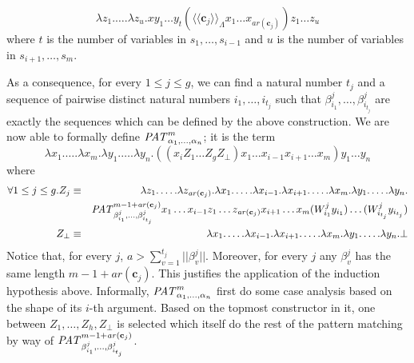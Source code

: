 \documentclass{LMCS}
\newcommand{\conone}{\mathbf{c}}
\newcommand{\patone}{s}
\newcommand{\seqpone}{\alpha}
\newcommand{\seqptwo}{\beta}
\newcommand{\varone}{x}
\newcommand{\vartwo}{y}
\newcommand{\varthree}{z}
\newcommand{\valuetwo}{W}
\newcommand{\valuethree}{Z}
\newcommand{\TRSonetolambdaI}[1]{\langle\!\langle #1\rangle\!\rangle_{\Lambdaterms}}
\newcommand{\errorterm}{\bot}
\newcommand{\arity}[1]{\mathit{ar}(#1)}
\newcommand{\dsize}[1]{||#1||}
\newcommand{\Lambdaterms}{\Lambda}
\newenvironment{varitemize}
{
\begin{list}{\labelitemi}
{\setlength{\itemsep}{0.0mm}
 \setlength{\topsep}{0.0mm}
 \setlength{\parindent}{0.0mm}
 \setlength{\parskip}{0.0mm}
 \setlength{\parsep}{0.0mm}
 \setlength{\partopsep}{0.0mm}
 \setlength{\leftmargin}{15pt}
 \setlength{\labelsep}{5pt}
 \setlength{\labelwidth}{10pt}}}
{
 \end{list} 
}
\newenvironment{varitemizeii}
{
\begin{list}{\labelitemiv}
{\setlength{\itemsep}{0.0mm}
 \setlength{\topsep}{0.0mm}
 \setlength{\parindent}{0.0mm}
 \setlength{\parskip}{0.0mm}
 \setlength{\parsep}{0.0mm}
 \setlength{\partopsep}{0.0mm}
 \setlength{\leftmargin}{15pt}
 \setlength{\labelsep}{5pt}
 \setlength{\labelwidth}{10pt}}}
{
 \end{list} 
}
\newcounter{number}
\begin{document}
\begin{varitemize}
\begin{varitemizeii}
$$    \lambda\varthree_1.\ldots.\lambda\varthree_u.\varone\vartwo_1\ldots\vartwo_t
    (\TRSonetolambdaI{\conone_j}\varone_1\ldots\varone_{\arity{\conone_j}})\varthree_1\ldots\varthree_u
    $$
    where $t$ is the number of variables in $\patone_1,\ldots,\patone_{i-1}$ and $u$ is the
    number of variables in $\patone_{i+1},\ldots,\patone_{m}$.
  \end{varitemizeii}
  As a consequence, for every $1\leq j\leq g$, we can find a natural number $t_j$ and 
  a sequence of pairwise distinct natural numbers $i_1,\ldots,i_{t_j}$ such that 
  $\seqptwo^j_{i_1},\ldots,\seqptwo^j_{i_{t_j}}$ are exactly the sequences which can
  be defined by the above construction. We are now able to formally define
  $\patlambda_{\seqpone_1,\ldots,\seqpone_n}^m$; it is the term
  $$
  \lambda\varone_1.\ldots.\lambda\varone_m.\lambda\vartwo_1.\ldots.\lambda\vartwo_n.
  ((\varone_i\valuethree_1\ldots\valuethree_g\valuethree_\bot)\varone_1\ldots\varone_{i-1}\varone_{i+1}\ldots\varone_m)
  \vartwo_1\ldots\vartwo_n
  $$
  where
  \begin{eqnarray*}
    \forall 1\leq j\leq g.\valuethree_j&\equiv&\lambda\varthree_1.\ldots.\lambda\varthree_{\arity{\conone_j}}.
    \lambda\varone_1.\ldots.\lambda\varone_{i-1}.\lambda\varone_{i+1}.\ldots.\lambda\varone_m.
    \lambda\vartwo_1.\ldots.\lambda\vartwo_n.\\
    & &\patlambda_{\seqptwo^j_{i_1},\ldots,\seqptwo^j_{i_{t_j}}}^{m-1+\arity{\conone_j}}\varone_1\ldots\varone_{i-1}\varthree_1\ldots\varthree_{\arity{\conone_j}}
      \varone_{i+1}\ldots\varone_m(\valuetwo^j_{i_1}\vartwo_{i_1})\ldots(\valuetwo^j_{i_{t_j}}\vartwo_{i_{t_j}})\\
    \valuethree_\bot&\equiv&\lambda\varone_1.\ldots.\lambda\varone_{i-1}.\lambda\varone_{i+1}.\ldots.\lambda\varone_m.
    \lambda\vartwo_1.\ldots.\lambda\vartwo_n.\errorterm
  \end{eqnarray*}
  Notice that, for every $j$,
  $a>\sum_{v=1}^{t_j}\dsize{\seqptwo^j_v}$. Moreover, for every $j$ any
  $\seqptwo^j_v$ has the same length $m-1+\arity{\conone_j}$.
  This justifies the application of the
  induction hypothesis above. Informally, $\patlambda_{\seqpone_1,\ldots,\seqpone_n}^m$ first do some case
  analysis based on the shape of its $i$-th argument. Based on the topmost constructor in it,
  one between $\valuethree_1,\ldots,\valuethree_h,\valuethree_\bot$ is selected which itself
  do the rest of the pattern matching by way of $\patlambda_{\seqptwo^j_{i_1},\ldots,\seqptwo^j_{i_{t_j}}}^{m-1+\arity{\conone_j}}$.
\end{varitemize}
\end{document}
